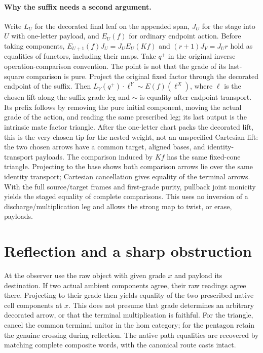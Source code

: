 \documentclass[11pt]{article}
\begin{document}
\paragraph{Why the suffix needs a second argument.} Write $L_U$ for the decorated final leaf on the appended span, $J_U$ for the stage into $U$ with one-letter payload, and $E_U(f)$ for ordinary endpoint action. Before taking components, $E_{U+1}(f)J_U=J_UE_U(Kf)$ and $(r+1)J_V=J_Ur$ hold as equalities of functors, including their maps. Take $q^+$ in the original inverse operation-comparison convention. The point is not that the grade of its last-square comparison is pure. Project the original fixed factor through the decorated endpoint of the suffix. Then
$L_V(q^+)\cdot \ell^{Y} \sim E(f)(\ell^{X})$,
where $\ell$ is the chosen lift along the suffix grade leg and $\sim$ is equality after endpoint transport. Its prefix follows by removing the pure initial component, moving the actual grade of the action, and reading the same prescribed leg; its last output is the intrinsic mate factor triangle. After the one-letter chart packs the decorated lift, this is the very chosen tip for the nested weight, not an unspecified Cartesian lift: the two chosen arrows have a common target, aligned bases, and identity-transport payloads. The comparison induced by $Kf$ has the same fixed-cone triangle. Projecting to the base shows both comparison arrows lie over the same identity transport; Cartesian cancellation gives equality of the terminal arrows. With the full source/target frames and first-grade purity, pullback joint monicity yields the staged equality of complete comparisons. This uses no inversion of a discharge/multiplication leg and allows the strong map to twist, or erase, payloads.


\section*{Reflection and a sharp obstruction}
At the observer use the raw object with given grade $x$ and payload its destination. If two actual ambient components agree, their raw readings agree there. Projecting to their grade then yields equality of the two prescribed native cell components at $x$. This does not presume that grade determines an arbitrary decorated arrow, or that the terminal multiplication is faithful. For the triangle, cancel the common terminal unitor in the hom category; for the pentagon retain the genuine crossing during reflection. The native path equalities are recovered by matching complete composite words, with the canonical route casts intact.
\end{document}
